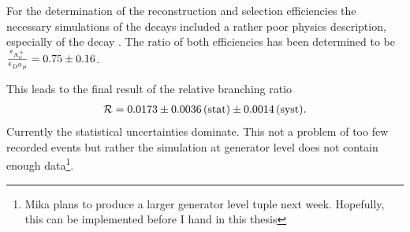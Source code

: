 For the determination of the reconstruction and selection efficiencies the necessary simulations of the decays included a rather poor physics description, especially of the decay \LbToDpmunuX.
The ratio of both efficiencies has been determined to be $\frac{\epsilon_{{{\Lambda}^+_{c}}}}{\epsilon_{{{D}^0}{p}}} = 0.75 \pm 0.16$.

This leads to the final result of the relative branching ratio
\begin{align*}
    \mathcal{R} = 0.0173 \pm 0.0036\mathrm{\,(stat)} \pm 0.0014\mathrm{\,(syst)}.
\end{align*}
Currently the statistical uncertainties dominate.
This not a problem of too few recorded events but rather the \LbToDpmunuX simulation at generator level does not contain enough data\footnote{Mika plans to produce a larger generator level tuple next week. Hopefully, this can be implemented before I hand in this thesis}.
